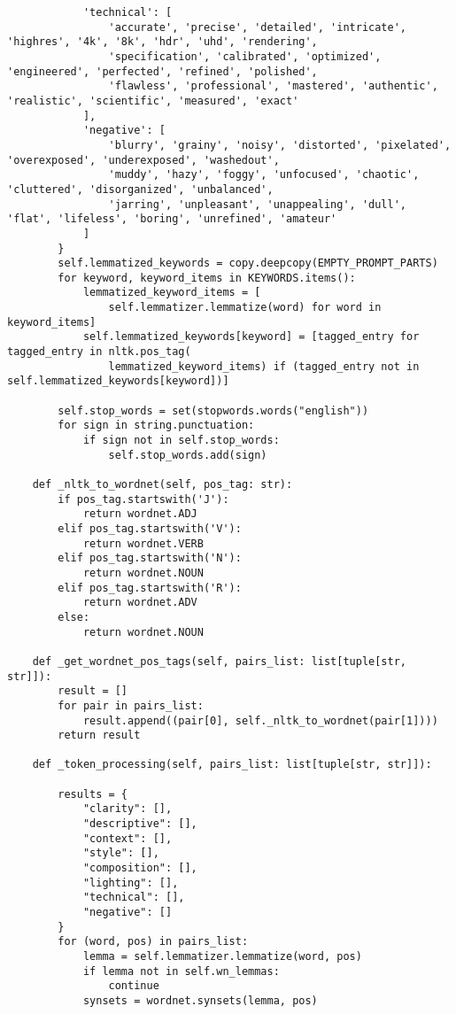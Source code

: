 \begin{verbatim}
            'technical': [
                'accurate', 'precise', 'detailed', 'intricate', 'highres', '4k', '8k', 'hdr', 'uhd', 'rendering',
                'specification', 'calibrated', 'optimized', 'engineered', 'perfected', 'refined', 'polished',
                'flawless', 'professional', 'mastered', 'authentic', 'realistic', 'scientific', 'measured', 'exact'
            ],
            'negative': [
                'blurry', 'grainy', 'noisy', 'distorted', 'pixelated', 'overexposed', 'underexposed', 'washedout',
                'muddy', 'hazy', 'foggy', 'unfocused', 'chaotic', 'cluttered', 'disorganized', 'unbalanced',
                'jarring', 'unpleasant', 'unappealing', 'dull', 'flat', 'lifeless', 'boring', 'unrefined', 'amateur'
            ]
        }
        self.lemmatized_keywords = copy.deepcopy(EMPTY_PROMPT_PARTS)
        for keyword, keyword_items in KEYWORDS.items():
            lemmatized_keyword_items = [
                self.lemmatizer.lemmatize(word) for word in keyword_items]
            self.lemmatized_keywords[keyword] = [tagged_entry for tagged_entry in nltk.pos_tag(
                lemmatized_keyword_items) if (tagged_entry not in self.lemmatized_keywords[keyword])]

        self.stop_words = set(stopwords.words("english"))
        for sign in string.punctuation:
            if sign not in self.stop_words:
                self.stop_words.add(sign)

    def _nltk_to_wordnet(self, pos_tag: str):
        if pos_tag.startswith('J'):
            return wordnet.ADJ
        elif pos_tag.startswith('V'):
            return wordnet.VERB
        elif pos_tag.startswith('N'):
            return wordnet.NOUN
        elif pos_tag.startswith('R'):
            return wordnet.ADV
        else:
            return wordnet.NOUN

    def _get_wordnet_pos_tags(self, pairs_list: list[tuple[str, str]]):
        result = []
        for pair in pairs_list:
            result.append((pair[0], self._nltk_to_wordnet(pair[1])))
        return result

    def _token_processing(self, pairs_list: list[tuple[str, str]]):

        results = {
            "clarity": [],
            "descriptive": [],
            "context": [],
            "style": [],
            "composition": [],
            "lighting": [],
            "technical": [],
            "negative": []
        }
        for (word, pos) in pairs_list:
            lemma = self.lemmatizer.lemmatize(word, pos)
            if lemma not in self.wn_lemmas:
                continue
            synsets = wordnet.synsets(lemma, pos)


\end{verbatim}
